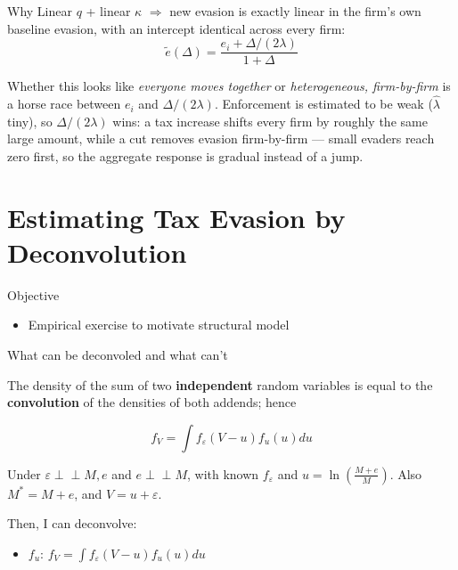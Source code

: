 \documentclass[
  ignorenonframetext,
  aspectratio=169,
]{beamer}
\providecommand{\tightlist}{%
  \setlength{\itemsep}{0pt}\setlength{\parskip}{0pt}}
\newcommand{\ind}{{\perp\!\!\!\perp}}
\begin{document}
\begin{frame}{Why}
\protect{}\label{why}
Linear \(q\) + linear \(\kappa\) \(\Rightarrow\) new evasion is exactly
linear in the firm's own baseline evasion, with an intercept identical
across every firm:
\[\tilde e(\Delta)=\frac{e_i+\Delta/(2\lambda)}{1+\Delta}\]

Whether this looks like \emph{everyone moves together} or
\emph{heterogeneous, firm-by-firm} is a horse race between \(e_i\) and
\(\Delta/(2\lambda)\). Enforcement is estimated to be weak
(\(\hat\lambda\) tiny), so \(\Delta/(2\lambda)\) wins: a tax increase
shifts every firm by roughly the same large amount, while a cut removes
evasion firm-by-firm --- small evaders reach zero first, so the
aggregate response is gradual instead of a jump.
\end{frame}

\section{Estimating Tax Evasion by
Deconvolution}\label{estimating-tax-evasion-by-deconvolution}

\begin{frame}{Objective}
\protect{}\label{objective}
\begin{itemize}
\tightlist
\item
  Empirical exercise to motivate structural model
\end{itemize}
\end{frame}

\begin{frame}{What can be deconvoled and what can't}
\protect{}\label{sec-what-can-deconv}
\begin{tcolorbox}[enhanced jigsaw, arc=.35mm, bottomrule=.15mm, bottomtitle=1mm, breakable, colback=white, colbacktitle=quarto-callout-note-color!10!white, colframe=quarto-callout-note-color-frame, coltitle=black, left=2mm, leftrule=.75mm, opacityback=0, opacitybacktitle=0.6, rightrule=.15mm, title={Convolution (Meister, 2009)}, titlerule=0mm, toprule=.15mm, toptitle=1mm]

The density of the sum of two \textbf{independent} random variables is
equal to the \textbf{convolution} of the densities of both addends;
hence

\[
f_V = \int f_\varepsilon(V - u)f_u(u)du
\]

\end{tcolorbox}

Under \(\varepsilon \ind M, e\) and \(e \ind M\), with known
\(f_\varepsilon\) and \(u=\ln\left(\frac{M+e}{M}\right)\). Also
\(M^*=M+e\), and \(V=u+\varepsilon\).

Then, I can deconvolve:

\begin{itemize}
\tightlist
\item
  \(f_u\): \(f_V = \int f_\varepsilon(V - u)f_u(u)du\)
\end{itemize}
\end{frame}
\end{document}
